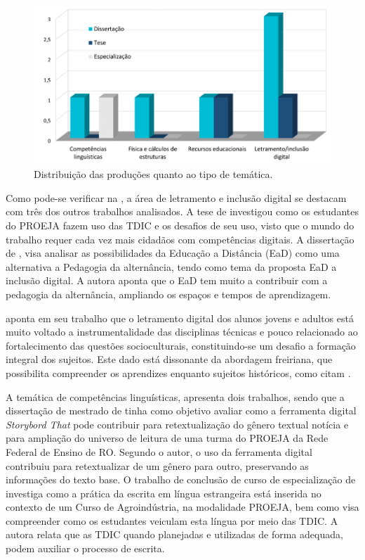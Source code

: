 \begin{figure}[!htpb]
\centering
\begin{minipage}{.75\textwidth}
\caption{Distribuição das produções quanto ao tipo de temática.}\label{fig7}
\includegraphics[width=\textwidth]{Fig7.png}
\end{minipage}
\end{figure}

Como pode-se verificar na , a área de letramento e inclusão
digital se destacam com três dos outros trabalhos analisados. A tese de
\textcite[203~f.;~il.]{Tonelli2012} investigou como os estudantes do PROEJA fazem uso
das TDIC e os desafios de seu uso, visto que o mundo do trabalho requer
cada vez mais cidadãos com competências digitais. A dissertação de \textcite[60~f]{Lobo2012}, visa analisar as possibilidades da Educação a Distância (EaD)
como uma alternativa a Pedagogia da alternância, tendo como tema da
proposta EaD a inclusão digital. A autora aponta que o EaD tem muito a
contribuir com a pedagogia da alternância, ampliando os espaços e tempos
de aprendizagem.

\textcite{rocha_os_2019} aponta em seu trabalho que o letramento digital dos alunos
jovens e adultos está muito voltado a instrumentalidade das disciplinas
técnicas e pouco relacionado ao fortalecimento das questões
socioculturais, constituindo-se um desafio a formação integral dos
sujeitos. Este dado está dissonante da abordagem freiriana, que
possibilita compreender os aprendizes enquanto sujeitos históricos, como
citam \textcite{morais2023}.

A temática de competências linguísticas, apresenta dois trabalhos, sendo
que a dissertação de mestrado de \textcite{Santos2021} tinha como objetivo
avaliar como a ferramenta digital \emph{Storybord That} pode contribuir
para retextualização do gênero textual notícia e para ampliação do
universo de leitura de uma turma do PROEJA da Rede Federal de Ensino de
RO. Segundo o autor, o uso da ferramenta digital contribuiu para
retextualizar de um gênero para outro, preservando as informações do
texto base. O trabalho de conclusão de curso de especialização de
\textcite{Silveira2021} investiga como a prática da escrita em língua
estrangeira está inserida no contexto de um Curso de Agroindústria, na
modalidade PROEJA, bem como visa compreender como os estudantes veiculam
esta língua por meio das TDIC. A autora relata que as TDIC quando
planejadas e utilizadas de forma adequada, podem auxiliar o processo de
escrita.

